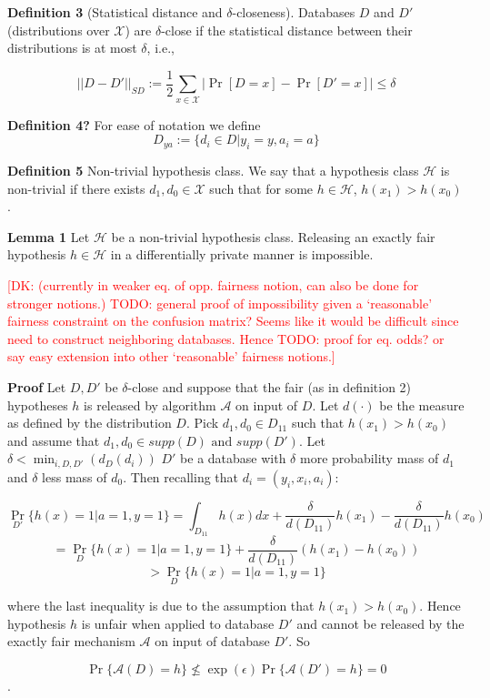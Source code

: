\documentclass[runningheads]{article}
\newcommand{\dk}[1]{\textcolor{red}{[DK: #1]}}
\newcommand{\A}{\mathcal{A}}
\renewcommand{\H}{\mathcal{H}}
\newcommand{\1}{\mathbbm{1}}
\theoremstyle{definition}
\begin{document}
{\bf Definition 3} (Statistical distance and $\delta$-closeness). Databases  $D$ and $D'$ (distributions over $\mathcal{X}$) are $\delta$-close if the statistical distance between their distributions is at most $\delta$, i.e.,

$$ ||D-D'||_{\textit{SD}} :=\frac{1}{2}\sum_{x\in \mathcal{X}} |\Pr[D=x] - \Pr[D'=x]| \leq \delta$$

{\bf Definition 4?} For ease of notation we define
$$D_{ya} := \{d_i \in D | y_i = y, a_i = a \}$$

{\bf Definition 5} Non-trivial hypothesis class. We say that a hypothesis class $\H$ is non-trivial if there exists $d_1, d_0 \in \mathcal{X}$ such that for some $h \in \H$, $h(x_1) > h(x_0)$.

{\bf Lemma 1} Let $\mathcal{H}$ be a non-trivial hypothesis class. Releasing an exactly fair hypothesis $h\in \mathcal{H}$ in a differentially private manner is impossible.

\dk{ (currently in weaker eq. of opp. fairness notion, can also be done for stronger notions.) TODO: general proof of impossibility given a `reasonable' fairness constraint on the confusion matrix? Seems like it would be difficult since need to construct neighboring databases. Hence TODO: proof for eq. odds? or say easy extension into other `reasonable' fairness notions.}

{\bf Proof} Let $D, D'$ be $\delta$-close and suppose that the fair (as in definition 2) hypotheses $h$ is released by algorithm $\mathcal{A}$ on input of $D$. Let $d(\cdot)$ be the measure as defined by the distribution $D$. Pick $d_1, d_0 \in D_{11}$ such that $h(x_1) > h(x_0)$ and assume that $d_1, d_0 \in supp(D) \text{ and } supp(D')$. Let $\delta < \min_{i,D,D'}(d_{D}(d_i))$ $D'$ be a database with $\delta$ more probability mass of $d_1$ and $\delta$ less mass of $d_0$. Then recalling that $d_i = (y_i, x_i, a_i)$:

$$\Pr_{D'}\{h(x) = 1 | a = 1, y=1\} = \int_{D_{11}}h(x)dx + \frac{\delta}{d(D_{11})} h(x_1) - \frac{\delta}{d(D_{11})} h(x_0) $$
$$= \Pr_{D}\{h(x) = 1 | a = 1, y=1\} + \frac{\delta}{d(D_{11})} (h(x_1) - h(x_0))$$
$$>  \Pr_{D}\{h(x) = 1 | a = 1, y=1\}$$

where the last inequality is due to the assumption that $h(x_1) > h(x_0)$. Hence hypothesis $h$ is unfair when applied to database $D'$ and cannot be released by the exactly fair mechanism $\A$ on input of database $D'$. So

$$\Pr\{\mathcal{A}(D) = h\} \not\leq \exp(\epsilon)\Pr\{\mathcal{A}(D') = h\} = 0$$.
\end{document}
